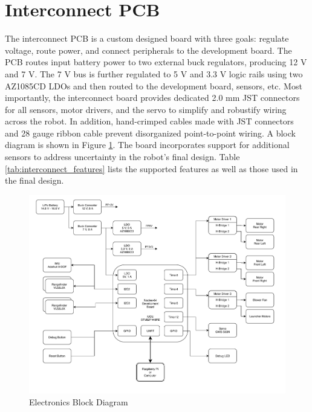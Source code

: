 \section{Interconnect PCB}
The interconnect PCB is a custom designed board with three goals: regulate voltage, route power, and connect peripherals to the development board. The PCB routes input battery power to two external buck regulators, producing 12 V and 7 V. The 7 V bus is further regulated to 5 V and 3.3 V logic rails using two AZ1085CD LDOs and then routed to the development board, sensors, etc. Most importantly, the interconnect board provides dedicated 2.0 mm JST connectors for all sensors, motor drivers, and the servo to simplify and robustify wiring across the robot. In addition, hand-crimped cables made with JST connectors and 28 gauge ribbon cable prevent disorganized point-to-point wiring. A block diagram is shown in Figure \ref{fig:interconnect_block}. The board incorporates support for additional sensors to address uncertainty in the robot's final design. Table \ref{tab:interconnect_features} lists the supported features as well as those used in the final design. 
\begin{figure}[H]   %
	\centering \includegraphics[width=6in, keepaspectratio]{figures/interconnect_block.pdf}
	\caption{Electronics Block Diagram}\label{fig:interconnect_block}
\end{figure}
